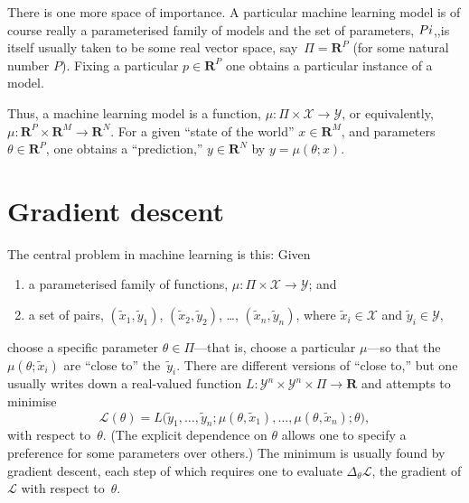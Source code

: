 \documentclass{article}
\newcommand{\set}[1]{\mathbf{#1}}
\begin{document}
There is one more space of importance.  A particular machine learning
model is of course really a parameterised family of models and the set
of parameters, $\\Pi$,,is itself usually taken to be some real vector
space, say~$\Pi=\set{R}^P$ (for some natural number $P$).  Fixing a
particular $p\in\set{R}^P$ one obtains a particular instance of a model.

Thus, a machine learning model is a function,
$\mu\colon \Pi\times\mathcal{X}\to\mathcal{Y}$, or equivalently,
$\mu\colon \set{R}^P\times\set{R}^M\to \set{R}^N$.  For a given ``state of the
world'' $x\in\set{R}^M$, and parameters $\theta\in \set{R}^P$, one obtains a
``prediction,'' $y\in\set{R}^N$ by $y = \mu(\theta; x)$.

\section{Gradient descent}

The central problem in machine learning is this: Given
\begin{enumerate}
\item a parameterised
family of functions, $\mu : \Pi\times\mathcal{X}\to\mathcal{Y}$; and
\item a set of pairs, 
$(\tilde{x}_1, \tilde{y}_1)$, $(\tilde{x}_2, \tilde{y}_2)$, \dots,
  $(\tilde{x}_n, \tilde{y}_n)$, where $\tilde{x}_i\in\mathcal{X}$ and
  $\tilde{y}_i\in\mathcal{Y}$,
\end{enumerate}
choose a specific parameter $\theta\in\Pi$---that is, choose a particular
$\mu$---so that the $\mu(\theta; \tilde{x}_i)$ are ``close to''
the~$\tilde{y}_i$.  There are different versions of ``close to,'' but
one usually writes down a real-valued function
$L\colon \mathcal{Y}^n\times\set{\mathcal{Y}}^n\times\Pi\to\set{R}$ and attempts to minimise
\begin{equation*}
  \label{eq:loss}
  \mathcal{L}(\theta) = L\bigl(\tilde{y}_1,\dotsc,\tilde{y}_n; \mu(\theta,\tilde{x}_1), \dotsc,
  \mu(\theta,\tilde{x}_n); \theta\bigr),
\end{equation*}
with respect to~$\theta$.  (The explicit dependence on $\theta$ allows one to
specify a preference for some parameters over others.)  The minimum is
usually found by gradient descent, each step of which requires one to
evaluate $\Delta_\theta \mathcal{L}$, the gradient of $\mathcal{L}$ with respect to~$\theta$.
\end{document}
